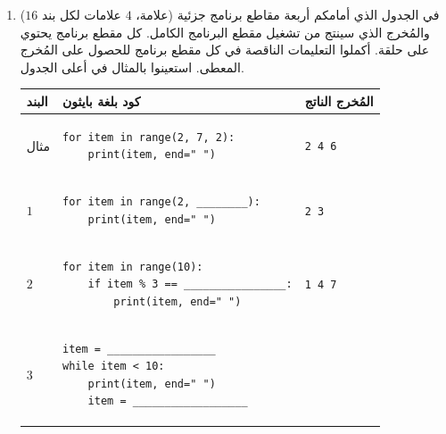 \documentclass[14pt]{extarticle}
\begin{document}
\begin{enumerate}[label=\textbf{السؤال \arabic*:}, wide=0pt, itemsep=2.2em]
\clearpage

\item ($16$ علامة، $4$ علامات لكل بند) في الجدول الذي أمامكم أربعة مقاطع برنامج جزئية والمُخرج الذي سينتج من تشغيل مقطع البرنامج الكامل. كل مقطع برنامج يحتوي على حلقة.
أكملوا التعليمات الناقصة في كل مقطع برنامج للحصول على المُخرج المعطى. استعينوا بالمثال في أعلى الجدول.

{\renewcommand{\arraystretch}{1.4}
\begin{longtable}{|C{1.5cm}|p{9cm}|C{4cm}|}
\hline
\textbf{البند} & \centering\textbf{كود بلغة بايثون} & \textbf{المُخرج الناتج} \\
\hline
مثال &
\begin{pycell}
\begin{english}
\begin{verbatim}
for item in range(2, 7, 2):
    print(item, end=" ")
\end{verbatim}
\end{english}
\end{pycell}
& \textenglish{\texttt{2 4 6}} \\
\hline
$1$ &
\begin{pycell}
\begin{english}
\begin{verbatim}
for item in range(2, ________):
    print(item, end=" ")
\end{verbatim}
\end{english}
\end{pycell}
& \textenglish{\texttt{2 3}} \\
\hline
$2$ &
\begin{pycell}
\begin{english}
\begin{verbatim}
for item in range(10):
    if item % 3 == ________________:
        print(item, end=" ")
\end{verbatim}
\end{english}
\end{pycell}
& \textenglish{\texttt{1 4 7}} \\
\hline
$3$ &
\begin{pycell}
\begin{english}
\begin{verbatim}
item = _________________
while item < 10:
    print(item, end=" ")
    item = __________________
\end{verbatim}
\end{english}
\end{pycell}

\end{longtable}}
\end{enumerate}
\end{document}
